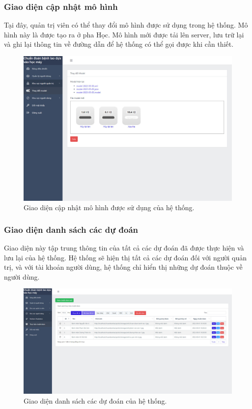 \subsubsection{Giao diện cập nhật mô hình}
Tại đây, quản trị viên có thể thay đổi mô hình được sử dụng trong hệ thống. Mô hình này là được tạo ra ở pha Học. Mô hình mới được tải lên server, lưu trữ lại và ghi lại thông tin về đường dẫn để hệ thống có thể gọi được khi cần thiết.
\begin{figure}[H]
	\centering
	\includegraphics[width=1\linewidth]{images/quantri_doi_model}
	\caption{Giao diện cập nhật mô hình được sử dụng của hệ thống.}
	\label{fig:quantri_doi_model}
\end{figure}

\subsubsection{Giao diện danh sách các dự đoán}
Giao diện này tập trung thông tin của tất cả các dự đoán đã được thực hiện và lưu lại của hệ thống. Hệ thống sẽ hiện thị tất cả các dự đoán đối với người quản trị, và với tài khoản người dùng, hệ thống chỉ hiển thị những dự đoán thuộc về người dùng.
\begin{figure}[H]
	\centering
	\includegraphics[width=0.95\linewidth]{images/user_danh_sach}
	\caption{Giao diện danh sách các dự đoán của hệ thống.}
	\label{fig:user_danh_sach}
\end{figure}

